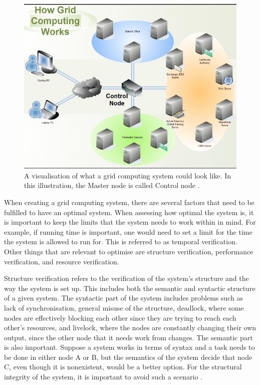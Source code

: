 \begin{figure}[H]
    \centering
    \includegraphics[scale=0.60]{figures/Grid-Computing.jpg}
    \caption{ 
    A visualisation of what a grid computing system could look like. In this illustration, the Master node is called Control node \cite{Gridcomputing_image}.}
    \label{fig:Grid computing illustration}
\end{figure}

When creating a grid computing system, there are several factors that need to be fulfilled to have an optimal system. When assessing how optimal the system is, it is important to keep the limits that the system needs to work within in mind. For example, if running time is important, one would need to set a limit for the time the system is allowed to run for. This is referred to as temporal verification.
Other things that are relevant to optimise are structure verification, performance verification, and resource verification.

Structure verification refers to the verification of the system's structure and the way the system is set up. This includes both the semantic and syntactic structure of a given system. The syntactic part of the system includes problems such as lack of synchronisation, general misuse of the structure, deadlock, where some nodes are effectively blocking each other since they are trying to reach each other's resources, and livelock, where the nodes are constantly changing their own output, since the other node that it needs work from changes.
The semantic part is also important. Suppose a system works in terms of syntax and a task needs to be done in either node A or B, but the semantics of the system decide that node C, even though it is nonexistent, would be a better option. For the structural integrity of the system, it is important to avoid such a scenario \cite{grid_workflow_validation}.

